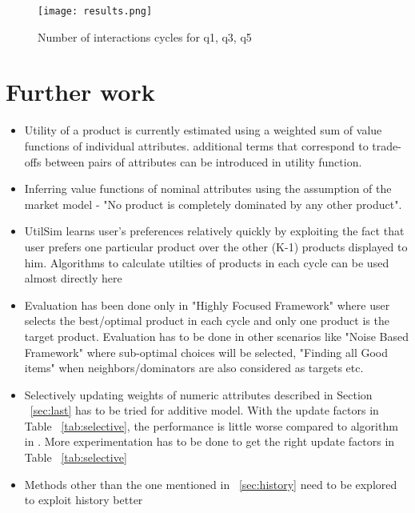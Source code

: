 \documentclass[10pt]{article}
\begin{document}

\begin{figure}
    \texttt{[image: results.png]}
  \caption{Number of interactions cycles for q1, q3, q5}
  \centering
\label{fig:results}
\end{figure}


\section{Further work}
\begin{itemize}

\item Utility of a product is currently estimated using a weighted sum of value functions of individual attributes.  additional terms that correspond to trade-offs between pairs of attributes can be introduced in utility function.

\item Inferring value functions of nominal attributes using the assumption of the market model - "No product is completely dominated by any other product".

\item UtilSim \cite{utilSim} learns user's preferences relatively quickly by exploiting the fact that user prefers one particular product over the other (K-1) products displayed to him. Algorithms to calculate utilties of products in each cycle can be used almost directly here


\item Evaluation has been done only in "Highly Focused Framework" where user selects the best/optimal product in each cycle and only one product is the target product. Evaluation has to be done in other scenarios like "Noise Based Framework" where sub-optimal choices will be selected, "Finding all Good items" when neighbors/dominators are also considered as targets etc.

\item Selectively updating weights of numeric attributes described in Section ~\ref{sec:last} has to be tried for additive model. With the update factors in Table ~\ref{tab:selective}, the performance is little worse compared to algorithm in \cite{zhang}. More experimentation has to be done to get the right update factors in Table ~\ref{tab:selective}

\item Methods other than the one mentioned in ~\ref{sec:history} need to be explored to exploit history better

\end{itemize}





\end{document}

